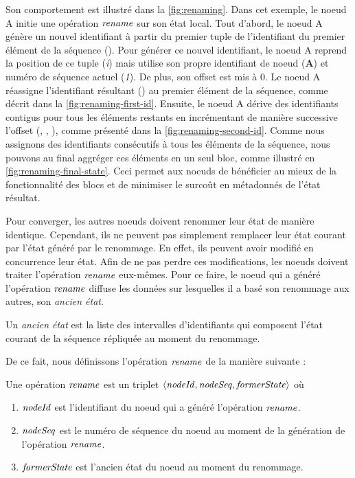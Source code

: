 Son comportement est illustré dans la \autoref{fig:renaming}.
Dans cet exemple, le noeud A initie une opération $\mathit{rename}$ sur son état local.
Tout d'abord, le noeud A génère un nouvel identifiant à partir du premier tuple de l'identifiant du premier élément de la séquence ().
Pour générer ce nouvel identifiant, le noeud A reprend la position de ce tuple (\emph{i}) mais utilise son propre identifiant de noeud (\textbf{A}) et numéro de séquence actuel (\emph{1}).
De plus, son offset est mis à 0.
Le noeud A réassigne l'identifiant résultant () au premier élément de la séquence, comme décrit dans la \autoref{fig:renaming-first-id}.
Ensuite, le noeud A dérive des identifiants contigus pour tous les éléments restants en incrémentant de manière successive l'offset (, , ), comme présenté dans la \autoref{fig:renaming-second-id}.
Comme nous assignons des identifiants consécutifs à tous les éléments de la séquence, nous pouvons au final aggréger ces éléments en un seul bloc, comme illustré en \autoref{fig:renaming-final-state}.
Ceci permet aux noeuds de bénéficier au mieux de la fonctionnalité des blocs et de minimiser le surcoût en métadonnés de l'état résultat.

Pour converger, les autres noeuds doivent renommer leur état de manière identique.
Cependant, ils ne peuvent pas simplement remplacer leur état courant par l'état généré par le renommage.
En effet, ils peuvent avoir modifié en concurrence leur état.
Afin de ne pas perdre ces modifications, les noeuds doivent traiter l'opération $\mathit{rename}$ eux-mêmes.
Pour ce faire, le noeud qui a généré l'opération $\mathit{rename}$ diffuse les données sur lesquelles il a basé son renommage aux autres, \ie son \emph{ancien état}.

\begin{definition}
  \label{def:former-state}
  Un \emph{ancien état} est la liste des intervalles d'identifiants qui composent l'état courant de la séquence répliquée au moment du renommage.
\end{definition}

De ce fait, nous définissons l'opération $\mathit{rename}$ de la manière suivante :

\begin{definition}[rename]
  \label{def:rename-op}
  Une opération $\mathit{rename}$ est un triplet $\langle \mathit{nodeId}, \mathit{nodeSeq}, \mathit{formerState} \rangle$ où
  \begin{enumerate}
    \item $\mathit{nodeId}$ est l'identifiant du noeud qui a généré l'opération $\mathit{rename}$.
    \item $\mathit{nodeSeq}$ est le numéro de séquence du noeud au moment de la génération de l'opération $\mathit{rename}$.
    \item $\mathit{formerState}$ est l'ancien état du noeud au moment du renommage.
  \end{enumerate}
\end{definition}

